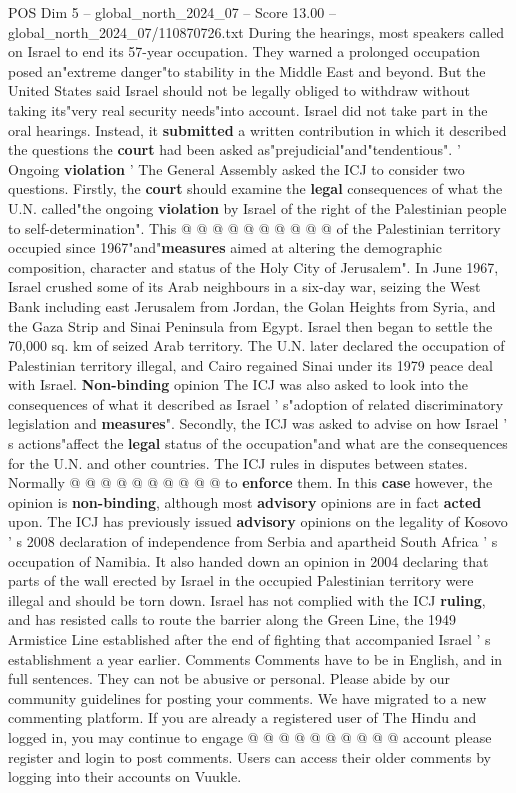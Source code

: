 \begin{textsample}{POS Dim 5 – global\_north\_2024\_07 – Score 13.00 – global\_north\_2024\_07/110870726.txt}
During the hearings, most speakers called on Israel to end its 57-year occupation.
They warned a prolonged occupation posed an"extreme danger"to stability in the Middle East and beyond.
But the United States said Israel should not be legally obliged to withdraw without taking its"very real security needs"into account.
Israel did not take part in the oral hearings.
Instead, it \textbf{submitted} a written contribution in which it described the questions the \textbf{court} had been asked as"prejudicial"and"tendentious". ' Ongoing \textbf{violation} ' The General Assembly asked the ICJ to consider two questions.
Firstly, the \textbf{court} should examine the \textbf{legal} consequences of what the U.N. called"the ongoing \textbf{violation} by Israel of the right of the Palestinian people to self-determination".
This @ @ @ @ @ @ @ @ @ @ of the Palestinian territory occupied since 1967"and"\textbf{measures} aimed at altering the demographic composition, character and status of the Holy City of Jerusalem".
In June 1967, Israel crushed some of its Arab neighbours in a six-day war, seizing the West Bank including east Jerusalem from Jordan, the Golan Heights from Syria, and the Gaza Strip and Sinai Peninsula from Egypt.
Israel then began to settle the 70,000 sq. km of seized Arab territory.
The U.N. later declared the occupation of Palestinian territory illegal, and Cairo regained Sinai under its 1979 peace deal with Israel. \textbf{Non-binding} opinion The ICJ was also asked to look into the consequences of what it described as Israel ' s"adoption of related discriminatory legislation and \textbf{measures}".
Secondly, the ICJ was asked to advise on how Israel ' s actions"affect the \textbf{legal} status of the occupation"and what are the consequences for the U.N. and other countries.
The ICJ rules in disputes between states.
Normally @ @ @ @ @ @ @ @ @ @ to \textbf{enforce} them.
In this \textbf{case} however, the opinion is \textbf{non-binding}, although most \textbf{advisory} opinions are in fact \textbf{acted} upon.
The ICJ has previously issued \textbf{advisory} opinions on the legality of Kosovo ' s 2008 declaration of independence from Serbia and apartheid South Africa ' s occupation of Namibia.
It also handed down an opinion in 2004 declaring that parts of the wall erected by Israel in the occupied Palestinian territory were illegal and should be torn down.
Israel has not complied with the ICJ \textbf{ruling}, and has resisted calls to route the barrier along the Green Line, the 1949 Armistice Line established after the end of fighting that accompanied Israel ' s establishment a year earlier.
Comments Comments have to be in English, and in full sentences.
They can not be abusive or personal.
Please abide by our community guidelines for posting your comments.
We have migrated to a new commenting platform.
If you are already a registered user of The Hindu and logged in, you may continue to engage @ @ @ @ @ @ @ @ @ @ account please register and login to post comments.
Users can access their older comments by logging into their accounts on Vuukle.

\end{textsample}
